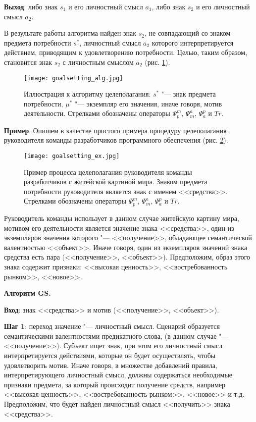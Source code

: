 \textbf{Выход}: либо знак $s_1$ и его личностный смысл $a_1$, либо знак $s_2$ и его личностный смысл $a_2$.

В результате работы алгоритма найден знак $s_2$, не совпадающий со знаком предмета потребности $s^*$, личностный смысл $a_2$ которого интерпретируется действием, приводящим к удовлетворению потребности. Целью, таким образом, становится знак $s_2$ с личностным смыслом $a_2$ (рис. \ref{fg:goalsetting_alg}).

\begin{figure}[h]
	\centering
	\texttt{[image: goalsetting\_alg.jpg]}
	\caption{Иллюстрация к алгоритму целеполагания: $s^*$ "--- знак предмета потребности, $\mu^*$ "--- экземпляр его значения, иначе говоря, мотив деятельности. Стрелками обозначены операторы $\Psi_p^m$, $\Psi_m^a$, $\Psi_a^p$ и $Tr$.}
	\label{fg:goalsetting_alg}
\end{figure}

\textbf{Пример}. Опишем в качестве простого примера процедуру целеполагания руководителя команды разработчиков программного обеспечения (рис. \ref{fg:goalsetting_ex}).

\begin{figure}[h]
	\centering
	\texttt{[image: goalsetting\_ex.jpg]}
	\caption{Пример процесса целеполагания руководителя команды разработчиков с житейской картиной мира. Знаком предмета потребности руководителя является знак с именем <<средства>>. Стрелками обозначены операторы $\Psi_p^m$, $\Psi_m^a$, $\Psi_a^p$ и $Tr$.}
	\label{fg:goalsetting_ex}
\end{figure}

Руководитель команды использует в данном случае житейскую картину мира, мотивом его деятельности является значение знака <<средства>>, один из экземпляров значения которого "--- <<получение>>, обладающее семантической валентностью <<объект>>. Иначе говоря, один из экземпляров значений знака средства есть пара (<<получение>>, <<объект>>). Предположим, образ этого знака содержит признаки: <<высокая ценность>>, <<востребованность рынком>>, <<новое>>.

\textbf{Алгоритм GS.}

\textbf{Вход}: знак <<средства>> и мотив (<<получение>>, <<объект>>).

\textbf{Шаг 1}: переход значение "--- личностный смысл. Сценарий образуется семантическими валентностями предикатного слова, (в данном случае "--- <<получение>>). Субъект ищет знак, при этом его личностный смысл интерпретируется действиями, которые он будет осуществлять, чтобы удовлетворить мотив. Иначе говоря, в множестве добавлений правила, интерпретирующего личностный смысл, должны содержаться необходимые признаки предмета, за который происходит получение средств, например <<высокая ценность>>, <<востребованность рынком>>, <<новое>> и т.д. Предположим, что будет найден личностный смысл <<получить>> знака <<средства>>.

